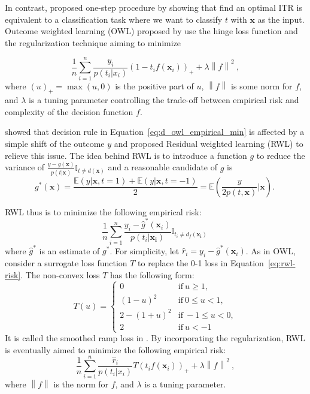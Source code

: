\documentclass{article}
\begin{document}
In contrast, \cite{zhao2012estimating} proposed one-step procedure by
showing that find an optimal ITR is equivalent to a classification task
where we want to classify $t$ with $\mathbf{x}$ as the input. Outcome weighted learning (OWL) proposed by
\cite{zhao2012estimating} use the hinge loss function and the
regularization technique aiming to minimize

\begin{equation}
  \frac{1}{n}\sum_{i=1}^{n}\frac{y_i}{p(t_i|x_i)}(1-t_if(\mathbf{x}_i))_{+}+\lambda\left
    \| f \right \|^2 ~\label{eq:d_owl_empirical_min},
\end{equation}
where $(u)_+=\max(u,0)$ is the positive part of $u$, $\left \| f
\right \|$ is some norm for $f$, and $\lambda$ is a tuning parameter
controlling the trade-off between empirical risk and complexity of the
decision function $f$.

\cite{Zhou_undated-ps} showed that decision rule in
Equation~\ref{eq:d_owl_empirical_min} is
affected by a simple shift of the outcome $y$ and proposed Residual
weighted learning (RWL) to relieve this issue. The idea behind RWL is
to introduce a function $g$ to reduce the variance of
$\frac{y-g(\mathbf{x})}{p(t|\mathbf{x})}\mathbb{I}_{t \neq
  d(\mathbf{x})}$ and a reasonable candidate of $g$ is
\begin{equation}
  g^{*}(\mathbf{x}) = \frac{\mathbb{E}(y|\mathbf{x},
    t=1)+\mathbb{E}(y|\mathbf{x}, t=-1)}{2} = \mathbb{E} \left (
    \frac{y}{2p(t, \mathbf{x})} | \mathbf{x} \right ).~\label{eq:g-choice}
\end{equation}

RWL thus is to minimize the following empirical risk:
\begin{equation}
   \frac{1}{n}\sum_{i=1}^{n}\frac{y_i-\hat{g}^{*}(\mathbf{x}_i)}{p(t_i|\mathbf{x_i})}\mathbb{I}_{t_i \neq
    d_f(\mathbf{x_i})}
  ~\label{eq:rwl-risk}
\end{equation}
where $\hat{g}^{*}$ is an estimate of $g^{*}$. For simplicity, let
$\hat{r}_i = y_i - \hat{g}^{*}(\mathbf{x}_i)$. As in OWL,
\cite{Zhou_undated-ps} consider a surrogate loss function $T$ to replace
the 0-1 loss in Equation~\ref{eq:rwl-risk}. The non-convex loss $T$
has the following form:
\begin{equation}
T(u) =  \left\{\begin{array}{ll}
 0 & \mathrm{if} \: u \geq 1, \\ 
 (1-u)^2 & \mathrm{if} \: 0 \leq u < 1, \\ 
 2-(1+u)^2 & \mathrm{if} \: -1 \leq u < 0, \\ 
 2 & \mathrm{if} \: u < -1
\end{array}\right.
\end{equation}
It is called the smoothed ramp loss in \cite{Zhou_undated-ps}. By
incorporating the regularization, RWL is eventually aimed to minimize
the following empirical risk:
\begin{equation}
    \frac{1}{n}\sum_{i=1}^{n}\frac{\hat{r}_i}{p(t_i|x_i)}T(t_if(\mathbf{x}_i))_{+}+\lambda\left
    \| f \right \|^2 ~\label{eq:d_owl_empirical_min},
\end{equation}
where $\left \| f \right \|$ is the norm for $f$, and $\lambda$ is a
tuning parameter.
\end{document}
